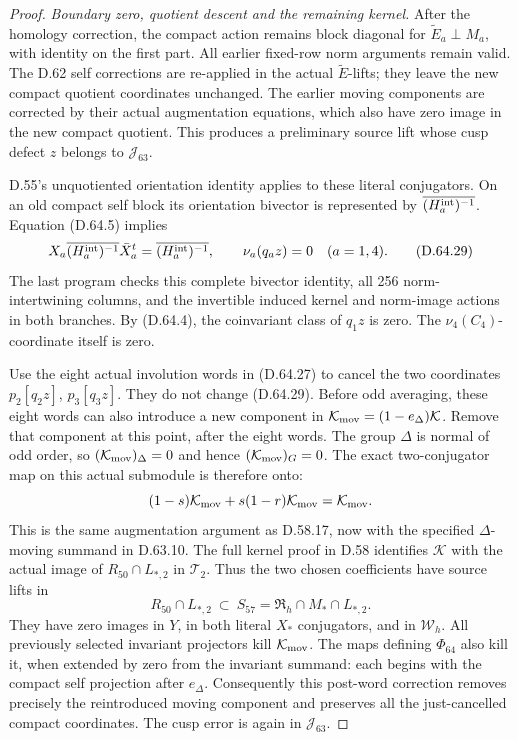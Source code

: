 \begin{proof}
\emph{Boundary zero, quotient descent and the remaining kernel.}
After the homology correction, the compact
action remains block diagonal for
\(\widetilde E_a\perp M_a\), with identity on
the first part. All earlier fixed-row norm
arguments remain valid. The D.62 self corrections
are re-applied in the actual
\(\widetilde E\)-lifts; they leave the new
compact quotient coordinates unchanged.
The earlier moving components are corrected
by their actual augmentation equations, which
also have zero image in the new compact quotient.
This produces a preliminary source lift whose
cusp defect \(z\) belongs to \(\mathcal J_{63}\).

D.55's unquotiented orientation identity applies
to these literal conjugators. On an old compact
self block its orientation bivector is represented
by \(\overline{(H_a^{\rm int})^{-1}}\).
Equation (D.64.5) implies
\[
 X_a\overline{(H_a^{\rm int})^{-1}}\bar X_a^t
                =\overline{(H_a^{\rm int})^{-1}},
 \qquad \nu_a(q_az)=0\quad(a=1,4).
 \tag{D.64.29}
\]
The last program checks this complete bivector
identity, all 256 norm-intertwining columns,
and the invertible induced kernel and norm-image
actions in both branches. By (D.64.4), the
coinvariant class of \(q_1z\) is zero. The
\(\nu_4(C_4)\)-coordinate itself is zero.

Use the eight actual involution words in
(D.64.27) to cancel the two coordinates
\(p_2[q_2z]\), \(p_3[q_3z]\). They do not
change (D.64.29). Before odd averaging, these
eight words can also introduce a new component
in \(\mathcal K_{\rm mov}=(1-e_\Delta)\mathcal K\).
Remove that component at this point, after the
eight words. The group \(\Delta\) is normal of
odd order, so \((\mathcal K_{\rm mov})_\Delta=0\)
and hence \((\mathcal K_{\rm mov})_G=0\).
The exact two-conjugator map on this actual
submodule is therefore onto:
\[
 (1-s)\mathcal K_{\rm mov}
       +s(1-r)\mathcal K_{\rm mov}=\mathcal K_{\rm mov}.
\]
This is the same augmentation argument as
D.58.17, now with the specified \(\Delta\)-moving
summand in D.63.10. The full kernel proof in
D.58 identifies \(\mathcal K\) with the actual
image of \(R_{50}\cap L_{*,2}\) in \(\mathcal T_2\).
Thus the two chosen coefficients have source
lifts in
\[
 R_{50}\cap L_{*,2}
       \ \subset\ S_{57}=\mathfrak R_h\cap M_*\cap L_{*,2}.
\]
They have zero images in \(Y\), in both literal
\(X_*\) conjugators, and in \(\mathcal W_h\).
All previously selected invariant projectors
kill \(\mathcal K_{\rm mov}\). The maps defining
\(\Phi_{64}\) also kill it, when extended by
zero from the invariant summand: each begins
with the compact self projection after \(e_\Delta\).
Consequently this post-word correction removes
precisely the reintroduced moving component
and preserves all the just-cancelled compact
coordinates. The cusp error is again in
\(\mathcal J_{63}\).


\end{proof}
